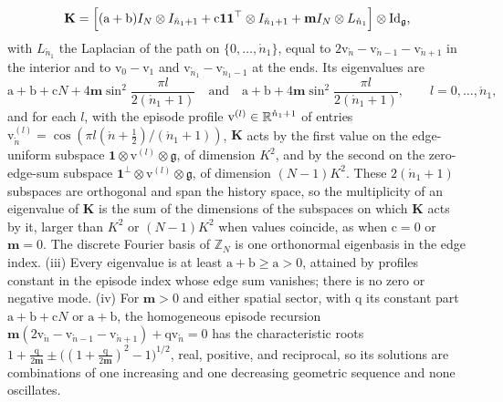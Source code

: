 \begin{equation}
\mathbf K=\Bigl[(\mathrm a+\mathrm b)I_N\otimes I_{\mathring n_1+1}+\mathrm c\mathbf 1\mathbf 1^\top\otimes I_{\mathring n_1+1}
+\mathbf mI_N\otimes L_{\mathring n_1}\Bigr]\otimes\mathrm{Id}_{\mathfrak g},
\label{eq:glink-ring-operator}
\end{equation}
with \(L_{\mathring n_1}\) the Laplacian of the path on \(\{0,\ldots,\mathring n_1\}\), equal to
\(2\mathrm v_{\mathring n}-\mathrm v_{\mathring n-1}-\mathrm v_{\mathring n+1}\) in the interior and to
\(\mathrm v_0-\mathrm v_1\) and \(\mathrm v_{\mathring n_1}-\mathrm v_{\mathring n_1-1}\) at the ends. Its eigenvalues are
\begin{equation}
\mathrm a+\mathrm b+\mathrm cN+4\mathbf m\sin^2\frac{\pi l}{2(\mathring n_1+1)}
\quad\text{and}\quad
\mathrm a+\mathrm b+4\mathbf m\sin^2\frac{\pi l}{2(\mathring n_1+1)},
\qquad l=0,\ldots,\mathring n_1,
\label{eq:glink-ring-spectrum}
\end{equation}
and for each \(l\), with the episode profile \(\mathrm v^{(l)}\in\mathbb R^{\mathring n_1+1}\) of entries
\(\mathrm v^{(l)}_{\mathring n}=\cos(\pi l(\mathring n+\tfrac12)/(\mathring n_1+1))\), \(\mathbf K\) acts by the first
value on the edge-uniform subspace \(\mathbf 1\otimes\mathrm v^{(l)}\otimes\mathfrak g\), of dimension \(K^2\), and by
the second on the zero-edge-sum subspace \(\mathbf 1^\perp\otimes\mathrm v^{(l)}\otimes\mathfrak g\), of dimension
\((N-1)K^2\). These \(2(\mathring n_1+1)\) subspaces are orthogonal and span the history space, so the
multiplicity of an eigenvalue of \(\mathbf K\) is the sum of the dimensions of the subspaces on which
\(\mathbf K\) acts by it, larger than \(K^2\) or \((N-1)K^2\) when values coincide, as when \(\mathrm c=0\) or
\(\mathbf m=0\). The discrete Fourier basis of \(\mathbb Z_N\) is one orthonormal eigenbasis in the edge index.
(iii) Every eigenvalue is at least
\(\mathrm a+\mathrm b\geq\mathrm a>0\), attained by profiles constant in the episode index whose edge sum
vanishes; there is no zero or negative mode. (iv) For \(\mathbf m>0\) and either spatial sector, with
\(\mathrm q\) its constant part \(\mathrm a+\mathrm b+\mathrm cN\) or \(\mathrm a+\mathrm b\), the homogeneous episode
recursion \(\mathbf m(2\mathrm v_{\mathring n}-\mathrm v_{\mathring n-1}-\mathrm v_{\mathring n+1})+\mathrm q\mathrm v_{\mathring n}=0\)
has the characteristic roots
\(1+\tfrac{\mathrm q}{2\mathbf m}\pm\bigl((1+\tfrac{\mathrm q}{2\mathbf m})^2-1\bigr)^{1/2}\), real, positive, and
reciprocal, so its solutions are combinations of one increasing and one decreasing geometric sequence and
none oscillates. 

